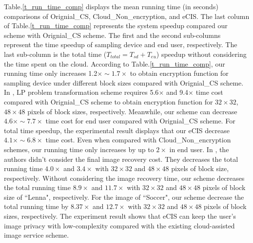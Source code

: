 \documentclass[conference]{IEEEtran}
\begin{document}
Table.\ref{t_run_time_comp} displays the mean running time (in seconds) comparisons of Orignial\_CS, Cloud\_Non\_encryption, and eCIS. The last column of Table.\ref{t_run_time_comp} represents the system speedup compared our scheme with Orignial\_CS scheme. The first and the second sub-columns represent the time speedup of sampling device and end user, respectively. The last sub-column is the total time ($T_{total}=T_{sd}+T_{eu}$) speedup without considering the time spent on the  cloud. According to Table.\ref{t_run_time_comp}, our running time  only increases  1.2$\times\sim1.7\times$  to obtain encryption function for sampling device under different block sizes compared with Orignial\_CS scheme.  In \cite{wang2014privacy}, LP problem transformation scheme requires 5.6$\times$ and 9.4$\times$ time cost compared with Orignial\_CS scheme to obtain encryption function for $32\times 32$, $48\times 48$ pixels of block sizes, respectively. Meanwhile, our scheme can decrease $4.6\times\sim7.7\times$ time cost for end user compared with Orignial\_CS scheme. For total time speedup, the experimental result displays that our eCIS  decrease $4.1\times\sim6.8\times$ time cost.  Even when compared  with Cloud\_Non\_encryption schemes, our running time only increases by up to $2\times$ in end user. In \cite{wang2014privacy}, the authors didn't consider the final image recovery cost. They decreases the total running time $4.0\times$ and $3.4\times$ with $32\times 32$ and $48\times 48$ pixels of block size, respectively. Without considering  the image recovery time, our scheme decreases the total running time $8.9\times$ and $11.7\times$ with $32\times 32$ and $48\times 48$ pixels of block size of ``Lenna", respectively. For the image of ``Soccer", our scheme decrease the total running time by $8.37\times$ and $12.7\times$ with $32\times 32$ and $48\times 48$ pixels of block sizes, respectively. The experiment result shows that eCIS can keep the user's image privacy with low-complexity  compared with the existing cloud-assisted image service scheme.
\end{document}
